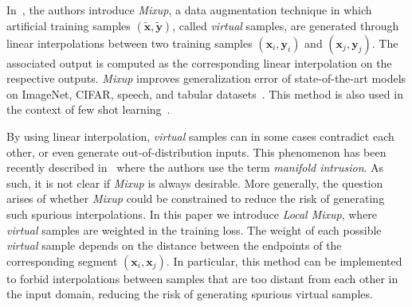 \documentclass[twoside]{article}
\numberwithin{intassumption}{assumption}
\begin{document}
In~\citep{zhang2017mixup}, the authors introduce \emph{Mixup}, a data augmentation technique in which artificial training samples $(\mathbf{\tilde x}, \mathbf{\tilde y})$, called \emph{virtual} samples, are generated through linear interpolations between two training samples $(\mathbf{x}_i,\mathbf{y}_i)$ and $(\mathbf{x}_j, \mathbf{y}_j)$. The associated output is computed as the corresponding linear interpolation on the respective outputs. \emph{Mixup} improves generalization error of state-of-the-art models on ImageNet, CIFAR, speech, and tabular datasets~\citep{zhang2017mixup}. This method is also used in the context of few shot learning~\citep{fewshot1,fewshot2}. 
















By using linear interpolation, \emph{virtual} samples can in some cases contradict each other, or even generate out-of-distribution inputs. This phenomenon has been recently described in~\citep{guo2019mixup} where the authors use the term \emph{manifold intrusion}. As such, it is not clear if \emph{Mixup} is always desirable. More generally, the question arises of whether \emph{Mixup} could be constrained to reduce the risk of generating such spurious interpolations. In this paper we introduce \emph{Local Mixup}, where \emph{virtual} samples are weighted in the training loss. The weight of each possible \emph{virtual} sample depends on the distance between the endpoints of the corresponding segment $(\mathbf{x}_i,\mathbf{x}_j)$. In particular, this method can be implemented to forbid interpolations between samples that are too distant from each other in the input domain, reducing the risk of generating spurious virtual samples.
\end{document}
